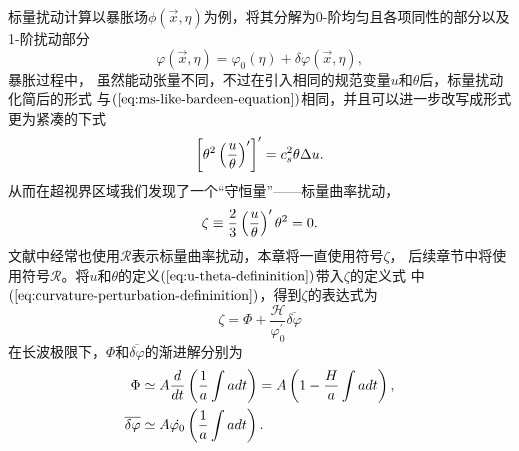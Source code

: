标量扰动计算以暴胀场$\phi(\vec{x},\eta)$为例，将其分解为0-阶均匀且各项同性的部分以及1-阶扰动部分
\begin{equation}
  \varphi(\vec{x},\eta)=\varphi_{0}(\eta)+\delta\varphi(\vec{x},\eta), 
\end{equation}
暴胀过程中，
虽然能动张量不同，不过在引入相同的规范变量$u$和$\theta$后，标量扰动化简后的形式
与$(\ref{eq:ms-like-bardeen-equation})$相同，并且可以进一步改写成形式更为紧凑的下式
\begin{equation}
  \left[\theta^2\left(\frac{u}{\theta}\right)^{\prime}\right]^{\prime} =
  c_{s}^2\theta\Delta u.
\end{equation}
从而在超视界区域我们发现了一个“守恒量”——标量曲率扰动，
\begin{equation}
  \label{eq:curvature-perturbation-defininition}
  \zeta\equiv \frac{2}{3}\left(\frac{u}{\theta}\right)^{\prime}\theta^2 = 0.
\end{equation}
文献中经常也使用$\mathcal{R}$表示标量曲率扰动，本章将一直使用符号$\zeta$，
后续章节中将使用符号$\mathcal{R}$。将$u$和$\theta$的定义$(\ref{eq:u-theta-defininition})$带入$\zeta$的定义式
中$(\ref{eq:curvature-perturbation-defininition})$，得到$\zeta$的表达式为
\begin{equation}
  \zeta = \Phi +
  \frac{\mathcal{H}}{\varphi^{\prime}_0}\overline{\delta\varphi}
\end{equation}
在长波极限下，$\Phi$和$\overline{\delta\varphi}$的渐进解分别为
\begin{align}
  \Phi &\simeq A\frac{d}{dt}\left(\frac{1}{a}\int a dt  \right) =
  A\left(1-\frac{H}{a}\int adt\right), \\
  \overline{\delta\varphi} &\simeq A \dot{\varphi_0}\left(\frac{1}{a}\int
  adt\right).
\end{align}

